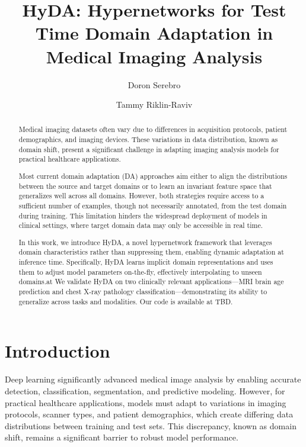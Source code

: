\documentclass[runningheads]{llncs}
\begin{document}
%
\title{HyDA:  Hypernetworks for Test Time Domain Adaptation in Medical Imaging Analysis}
%

\author{Doron Serebro \and 
Tammy Riklin-Raviv}


    
\maketitle              %
%


\begin{abstract}
Medical imaging datasets often vary due to differences in acquisition protocols, patient demographics, and imaging devices. These variations in data distribution, known as domain shift, present a significant challenge in adapting imaging analysis models for practical healthcare applications.

Most current domain adaptation (DA) approaches aim either to align the distributions between the source and target domains or to learn an invariant feature space that generalizes well across all domains. However, both strategies require access to a sufficient number of examples, though not necessarily annotated, from the test domain during training. This limitation hinders the widespread deployment of models in clinical settings, where target domain data may only be accessible in real time.

In this work, we introduce HyDA, a novel hypernetwork framework that leverages domain characteristics rather than suppressing them, enabling dynamic adaptation at inference time. Specifically, HyDA learns implicit domain representations and uses them to adjust model parameters on-the-fly, effectively interpolating to unseen domains.at We validate HyDA on two clinically relevant applications—MRI brain age prediction and chest X-ray pathology classification—demonstrating its ability to generalize across tasks and modalities.
Our code is available at TBD.
\end{abstract}
\section{Introduction}
Deep learning significantly advanced medical image analysis by enabling accurate detection, classification, segmentation, and predictive modeling. However, for practical healthcare applications, models must adapt to variations in imaging protocols, scanner types, and patient demographics, which create differing data distributions between training and test sets. This discrepancy, known as domain shift, remains a significant barrier to robust model performance. 
\end{document}
